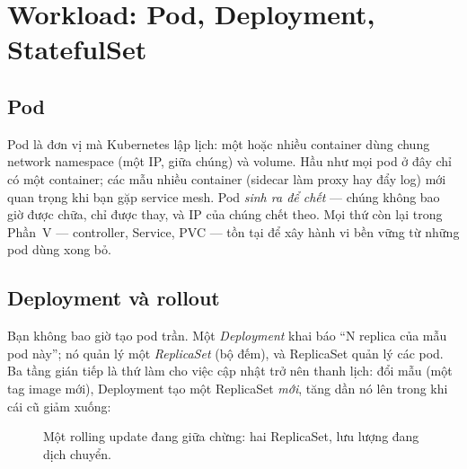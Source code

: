 \chapter{Workload: Pod, Deployment, StatefulSet}
\label{ch:workloads}

\section{Pod}

Pod là đơn vị mà Kubernetes lập lịch: một hoặc nhiều container dùng
chung network namespace (một IP,  giữa chúng) và volume.
Hầu như mọi pod ở đây chỉ có một container; các mẫu nhiều container
(sidecar làm proxy hay đẩy log) mới quan trọng khi bạn gặp service mesh.
Pod \emph{sinh ra để chết} --- chúng không bao giờ được chữa, chỉ được
thay, và IP của chúng chết theo. Mọi thứ còn lại trong Phần~V ---
controller, Service, PVC --- tồn tại để xây hành vi bền vững từ những
pod dùng xong bỏ.

\section{Deployment và rollout}

Bạn không bao giờ tạo pod trần. Một \emph{Deployment} khai báo ``N
replica của mẫu pod này''; nó quản lý một \emph{ReplicaSet} (bộ đếm),
và ReplicaSet quản lý các pod. Ba tầng gián tiếp là thứ làm cho việc
cập nhật trở nên thanh lịch: đổi mẫu (một tag image mới), Deployment
tạo một ReplicaSet \emph{mới}, tăng dần nó lên trong khi cái cũ giảm
xuống:

\begin{figure}[h]
\centering
{}
\caption{Một rolling update đang giữa chừng: hai ReplicaSet, lưu lượng đang dịch chuyển.}
\end{figure}

